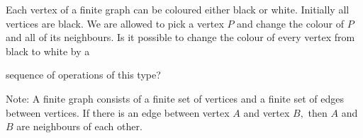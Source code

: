 Each vertex of a finite graph can be coloured either black or white. Initially all vertices are black. We are allowed to pick a vertex $P$ and change the colour of $P$ and all of its neighbours. Is it possible to change the colour of every vertex from black to white by a

sequence of operations of this type?

Note: A finite graph consists of a finite set of vertices and a finite set of edges between vertices. If there is an edge between vertex $A$ and vertex $B,$ then $A$ and $B$ are neighbours of each other.